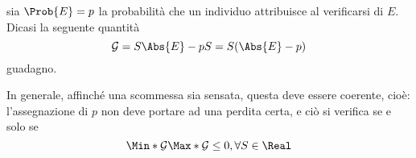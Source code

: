 \documentclass{subfiles}
\begin{document}
\begin{Definition*}
    sia $\Prob{E} = p$ la probabilità che un individuo attribuisce al verificarsi di $E$.
    Dicasi la seguente quantità
    $$
        \mathcal{G} = S \Abs{E} - pS = S(\Abs{E} - p)
    $$
    guadagno.
\end{Definition*}
In generale, affinché una scommessa sia sensata, questa deve essere coerente, cioè:
l'assegnazione di $p$ non deve portare ad una perdita certa, e ciò si verifica se e solo se
$$
    \Min*{\mathcal{G}} \Max*{\mathcal{G}} \le 0, \forall S \in \Real
$$
\end{document}
